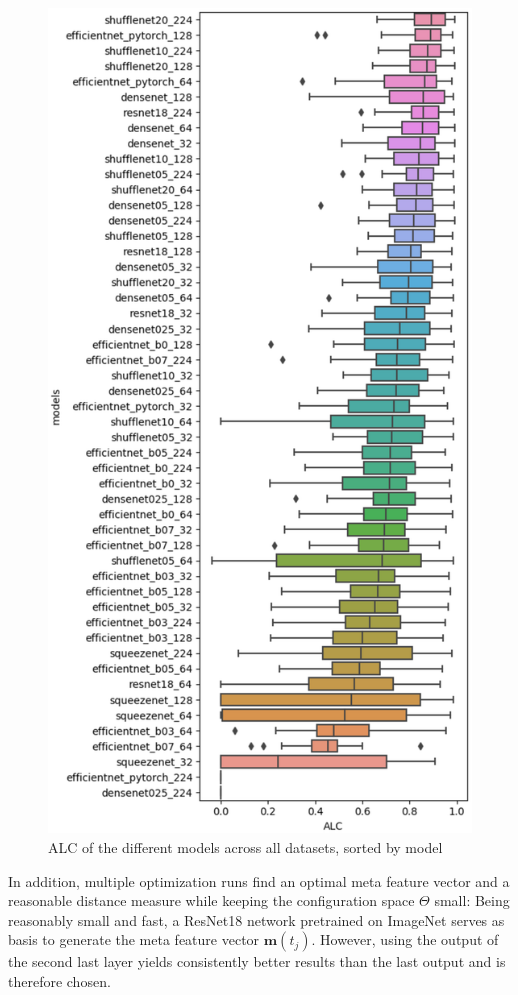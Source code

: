 \documentclass{article}
\begin{document}
\begin{figure}[htb]
\begin{center}
 	\includegraphics[width=0.85\linewidth]{../figures/accuracy_results.eps} 
\end{center}
\caption{ALC of the different models across all datasets, sorted by model}
\label{fig:rank_results}
\end{figure} 

In addition, multiple optimization runs find an optimal meta feature vector and a reasonable distance measure while keeping the configuration space $\Theta$ small: Being reasonably small and fast, a ResNet18 network pretrained on ImageNet serves as basis to generate the meta feature vector $\mathbf{m}(t_j)$. However, using the output of the second last layer yields consistently better results than the last output and is therefore chosen.
\end{document}
